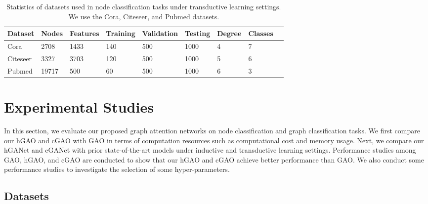 \documentclass[sigconf]{acmart}
\begin{document}
\begin{table*}[t]
\centering \caption{Statistics of datasets used in node classification tasks under transductive
learning settings. We use the Cora, Citeseer, and Pubmed datasets.}\label{table:transdatasets}
\begin{tabularx}{\textwidth}{  XYYYYYYYY }
    \hline
    \textbf{Dataset} & \textbf{Nodes} &
    \textbf{Features} & \textbf{Training} &
    \textbf{Validation} & \textbf{Testing} & \textbf{Degree} & \textbf{Classes} \\ \hline\hline
    Cora      & 2708   & 1433 & 140   & 500 & 1000 & 4 & 7    \\ \hline
    Citeseer  & 3327   & 3703 & 120   & 500 & 1000 & 5 & 6    \\ \hline
    Pubmed    & 19717  & 500  & 60    & 500 & 1000 & 6 & 3    \\ \hline
    \hline
\end{tabularx}
\end{table*}




\section{Experimental Studies}

In this section, we evaluate our proposed graph attention networks
on node classification and graph classification tasks. We first
compare our hGAO and cGAO with GAO in terms of computation resources
such as computational cost and memory usage. Next, we compare our
hGANet and cGANet with prior state-of-the-art models under inductive
and transductive learning settings. Performance studies among GAO,
hGAO, and cGAO are conducted to show that our hGAO and cGAO achieve
better performance than GAO. We also conduct some performance
studies to investigate the selection of some hyper-parameters.

\subsection{Datasets}\label{sec:dataset}
\end{document}

